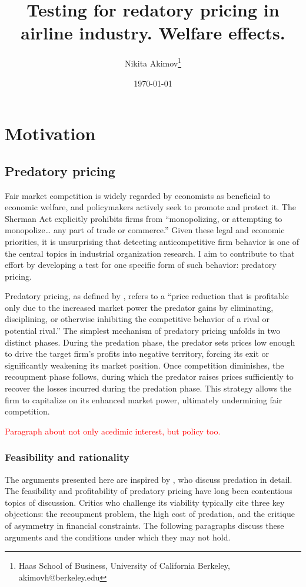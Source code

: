 \documentclass[12pt,oneside]{article}
\title{Testing for redatory pricing in airline industry. Welfare effects.}
\author{Nikita Akimov\thanks{Haas School of Business, University of California Berkeley, akimovh@berkeley.edu}}
\date{\today}
\theoremstyle{definition}
\theoremstyle{remark}
\begin{document}
\maketitle

\section{Motivation}

\subsection{Predatory pricing}

Fair market competition is widely regarded by economists as beneficial to economic welfare, and policymakers actively seek to promote and protect it. The Sherman Act explicitly prohibits firms from “monopolizing, or attempting to monopolize… any part of trade or commerce.” Given these legal and economic priorities, it is unsurprising that detecting anticompetitive firm behavior is one of the central topics in industrial organization research. I aim to contribute to that effort by developing a test for one specific form of such behavior: predatory pricing.

Predatory pricing, as defined by \cite{Bolton2000}, refers to a “price reduction that is profitable only due to the increased market power the predator gains by eliminating, disciplining, or otherwise inhibiting the competitive behavior of a rival or potential rival.” The simplest mechanism of predatory pricing unfolds in two distinct phases. During the predation phase, the predator sets prices low enough to drive the target firm's profits into negative territory, forcing its exit or significantly weakening its market position. Once competition diminishes, the recoupment phase follows, during which the predator raises prices sufficiently to recover the losses incurred during the predation phase. This strategy allows the firm to capitalize on its enhanced market power, ultimately undermining fair competition.

\textcolor{red}{Paragraph about not only acedimic interest, but policy too.} 

\subsubsection{Feasibility and rationality}
The arguments presented here are inspired by \cite{Ordover1989}, who discuss predation in detail. The feasibility and profitability of predatory pricing have long been contentious topics of discussion. Critics who challenge its viability typically cite three key objections: the recoupment problem, the high cost of predation, and the critique of asymmetry in financial constraints. The following paragraphs discuss these arguments and the conditions under which they may not hold.
\end{document}
